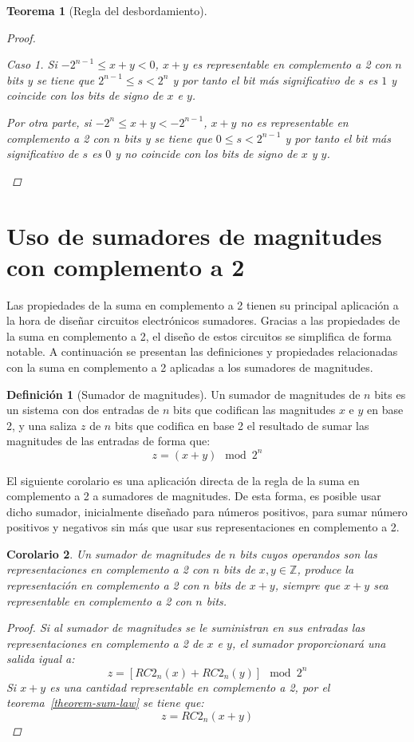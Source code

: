 \documentclass[spanish,a4paper,12pt,titlepage]{article}
\newtheorem{theorem}{Teorema}%
\newtheorem{corollary}[theorem]{Corolario}
\theoremstyle{definition}
\newtheorem{definition}{Definición}%
\theoremstyle{remark}
\newtheorem{case}{Caso}
\newcommand{\bbZ}{\mathbb{Z}}
\begin{document}
\begin{theorem}[Regla del desbordamiento]
\begin{proof}
\begin{case}
      Si $-2^{n-1} \le x+y < 0$, $x+y$ es representable en complemento a 2 con $n$ bits y se tiene que $2^{n-1} \le s < 2^n$ y por tanto el bit más significativo de $s$ es $1$ y coincide con los bits de signo de $x$ e $y$.

      Por otra parte, si $-2^n \le x+y < -2^{n-1}$, $x+y$ no es representable en complemento a 2 con $n$ bits y se tiene que $0 \le s < 2^{n-1}$ y por tanto el bit más significativo de $s$ es $0$ y no coincide con los bits de signo de $x$ y $y$.
    \end{case}
  \end{proof}
\end{theorem}

\section{Uso de sumadores de magnitudes con complemento a 2}

Las propiedades de la suma en complemento a 2 tienen su principal aplicación a la hora de diseñar circuitos electrónicos sumadores. Gracias a las propiedades de la suma en complemento a 2, el diseño de estos circuitos se simplifica de forma notable. A continuación se presentan las definiciones y propiedades relacionadas con la suma en complemento a 2 aplicadas a los sumadores de magnitudes.

\begin{definition}[Sumador de magnitudes]
  Un sumador de magnitudes de $n$ bits es un sistema con dos entradas de $n$ bits que codifican las magnitudes $x$ e $y$ en base 2, y una saliza $z$ de $n$ bits que codifica en base 2 el resultado de sumar las magnitudes de las entradas de forma que:
  \[
    z = (x + y) \mod 2^n
  \]
\end{definition}

El siguiente corolario es una aplicación directa de la regla de la suma en complemento a 2 a sumadores de magnitudes. De esta forma, es posible usar dicho sumador, inicialmente diseñado para números positivos, para sumar número positivos y negativos sin más que usar sus representaciones en complemento a 2.

\begin{corollary}
  Un sumador de magnitudes de $n$ bits cuyos operandos son las representaciones en complemento a 2 con $n$ bits de $x, y \in \bbZ$, produce la representación en complemento a 2 con $n$ bits de $x+y$, siempre que $x+y$ sea representable en complemento a 2 con $n$ bits.
  \begin{proof}
    Si al sumador de magnitudes se le suministran en sus entradas las representaciones en complemento a 2 de $x$ e $y$, el sumador proporcionará una salida igual a:
    \[
      z = [RC2_n(x)+RC2_n(y)] \mod 2^n
    \]
    Si $x+y$ es una cantidad representable en complemento a 2, por el teorema~\ref{theorem-sum-law} se tiene que:
    \[
      z = RC2_n(x + y)
    \]
  \end{proof}
\end{corollary}
\end{document}
